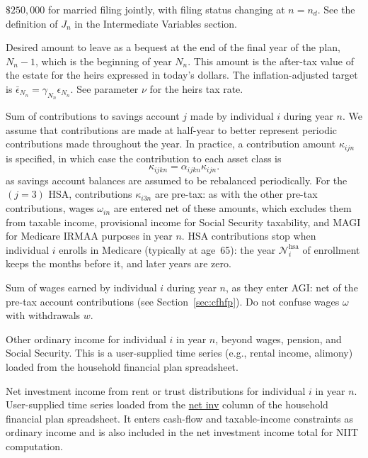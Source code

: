 \documentclass[fleqn,12pt]{report}
\newcommand{\code}[1]{\url{#1}}
\begin{document}
\begin{description}[leftmargin=4em,style=multiline]
	$\$250{,}000$ for married filing jointly, with filing status changing at $n = n_d$.
	See the definition of $J_n$ in the Intermediate Variables section.
\item [$\epsilon_{N_n}$]
	Desired amount to leave as a bequest at the end of the final year of the plan, $N_n-1$,
	which is the beginning of year $N_n$. This amount is the after-tax value of the estate
	for the heirs expressed in today's dollars. The inflation-adjusted target is
	$\bar\epsilon_{N_n} = \gamma_{N_n}\epsilon_{N_n}$.
	See parameter $\nu$ for the heirs tax rate.
\item [$\kappa_{ijn}$]
	Sum of contributions to savings account $j$ made by individual $i$ during year $n$.
	We assume that contributions are made at half-year to better represent periodic
        contributions made throughout the year.
	In practice, a contribution
	amount $\kappa_{ijn}$ is specified, in which case the contribution to each asset
	class is
	\begin{equation}
		\kappa_{ijkn} = \alpha_{ijkn}\kappa_{ijn}.
	\end{equation}
	as savings account balances are assumed to be rebalanced periodically.
	For the $(j=3)$ HSA, contributions $\kappa_{i3n}$ are pre-tax: as with the
	other pre-tax contributions, wages $\omega_{in}$ are entered net of these
	amounts, which excludes them from taxable income, provisional income for
	Social Security taxability, and MAGI for Medicare IRMAA purposes in year $n$.
	HSA contributions stop when individual $i$ enrolls in Medicare (typically at
	age~65): the year $\mathcal{N}^{\mathrm{hsa}}_i$ of enrollment keeps the
	months before it, and later years are zero.
\item [$\omega_{in}$]
	Sum of wages earned by individual $i$ during year $n$, as they enter AGI:
	net of the pre-tax account contributions (see Section~\ref{sec:cfhfp}).
	Do not confuse wages $\omega$ with withdrawals $w$.
\item [$\upsilon_{in}$]
	Other ordinary income for individual $i$ in year $n$, beyond wages, pension, and Social Security.
	This is a user-supplied time series (e.g., rental income, alimony) loaded from the household
	financial plan spreadsheet.
\item [$\nu_{in}$]
	Net investment income from rent or trust distributions for individual $i$ in year $n$.
	User-supplied time series loaded from the \code{net inv} column of the household financial
	plan spreadsheet. It enters cash-flow and taxable-income constraints as ordinary income
	and is also included in the net investment income total for NIIT computation.

\end{description}
\end{document}
